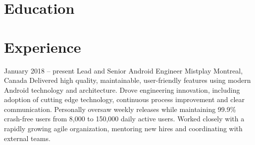 \documentclass[10pt,a4paper,sans]{moderncv} %
\newcommand{\vs}[0]{\smallskip}
\begin{document}
\makecvtitle %
\par
\vspace{-6ex}


\section{Education}

\renewcommand{\listitemsymbol}{-~} %

\vs
{}



\section{Experience}



\cventry
{January 2018 -- present}
{Lead and Senior Android Engineer}
{{Mistplay}}
{Montreal, Canada}
{}{Delivered high quality, maintainable, user-friendly features using modern Android technology and architecture. Drove engineering innovation, including adoption of cutting edge technology, continuous process improvement and clear communication. Personally oversaw weekly releases while maintaining 99.9\% crash-free users from 8,000 to 150,000 daily active users. Worked closely with a rapidly growing agile organization, mentoring new hires and coordinating with external teams.}\vs
\end{document}
